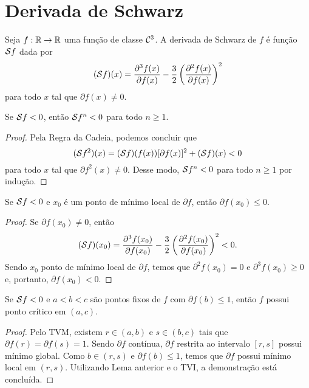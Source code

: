\section{Derivada de Schwarz}

\begin{definition}
Seja $f: \mathbb{R} \to \mathbb{R}$ uma função de classe $\mathcal{C}^3$.
A derivada de Schwarz de $f$ é função $\mathcal{S} f$ dada por
$$(\mathcal{S} f)(x) = \frac{\partial^3 f(x)}{\partial f(x)} - \frac{3}{2} \left( \frac{\partial^2 f(x)}{\partial f(x)} \right)^2$$
para todo $x$ tal que $\partial f(x) \neq 0$.
\end{definition}

\begin{proposition}
Se $\mathcal{S} f < 0$, então $\mathcal{S} f^n < 0$ para todo $n \geq 1$.
\end{proposition}

\begin{proof}
Pela Regra da Cadeia, podemos concluir que
$$(\mathcal{S} f^2)(x) = (\mathcal{S} f)(f(x)) [\partial f(x)]^2 + (\mathcal{S} f)(x) < 0$$
para todo $x$ tal que $\partial f^2(x) \neq 0$.
Desse modo, $\mathcal{S} f^n < 0$ para todo $n \geq 1$ por indução.
\end{proof}

\begin{lemma}
\label{lemma1}
Se $\mathcal{S} f < 0$ e $x_0$ é um ponto de mínimo local de $\partial f$, então $\partial f(x_0) \leq 0$.
\end{lemma}

\begin{proof}
Se $\partial f(x_0) \neq 0$, então
$$(\mathcal{S} f)(x_0) = \frac{\partial^3 f(x_0)}{\partial f(x_0)} - \frac{3}{2} \left( \frac{\partial^2 f(x_0)}{\partial f(x_0)} \right)^2 < 0.$$
Sendo $x_0$ ponto de mínimo local de $\partial f$, temos que $\partial^2 f(x_0) = 0$ e $\partial^3 f(x_0) \geq 0$ e, portanto, $\partial f(x_0) < 0$. 
\end{proof}

\begin{lemma}
\label{lemma2}
Se $\mathcal{S} f < 0$ e $a<b<c$ são pontos fixos de $f$ com $\partial f(b) \leq 1$, então $f$ possui ponto crítico em $(a, c)$.
\end{lemma}

\begin{proof}
Pelo TVM, existem $r \in (a,b)$ e $s \in (b,c)$  tais que $\partial f(r) = \partial f(s) = 1$.
Sendo $\partial f$ contínua, $\partial f$ restrita ao intervalo $[r,s]$ possui mínimo global.
Como $b \in (r,s)$ e $\partial f(b) \leq 1$, temos que $\partial f$ possui mínimo local em $(r,s)$.
Utilizando Lema anterior e o TVI, a demonstração está concluída.
\end{proof}

